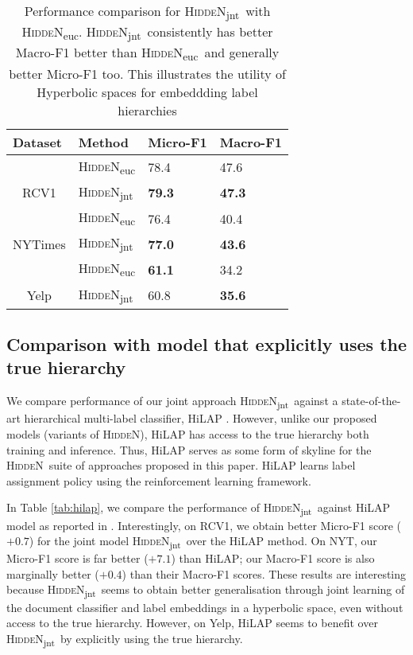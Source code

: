 \documentclass[11pt,a4paper]{article}
\newcommand{\model}{\mbox{\textsc{HiddeN}}}
\newcommand{\modeljnt}{\mbox{\textsc{HiddeN}\textsubscript{jnt}}}
\newcommand{\modeleuc}{\mbox{\textsc{HiddeN}\textsubscript{euc}}}
\begin{document}
\begin{table}[!h]
\centering
\caption{Performance comparison for \modeljnt\ with \modeleuc. \modeljnt\ consistently has better Macro-F1 better than \modeleuc\ and generally better Micro-F1 too. This illustrates the utility of Hyperbolic spaces for embeddding label hierarchies}
\label{tab:main-eucjnt}
\begin{adjustbox}{max width=0.48\textwidth}
\begin{tabular}{llll} 
\toprule
\multicolumn{1}{l}{Dataset} & Method & Micro-F1 & Macro-F1 \\ 
\toprule
& \modeleuc & 78.4 & 47.6 \\
\multicolumn{1}{c}{RCV1}
& \modeljnt & \textbf{79.3} & \textbf{47.3} \\
\hline\hline
& \modeleuc & 76.4 & 40.4 \\
\multicolumn{1}{c}{NYTimes}
 & {\modeljnt}& \textbf{77.0} & \textbf{43.6} \\
\hline\hline
& \modeleuc & \textbf{61.1}& 34.2\\
\multicolumn{1}{c}{Yelp} 
& {\modeljnt} & 60.8 & \textbf{35.6} \\
\bottomrule
\end{tabular}
\end{adjustbox}
\end{table}

\subsection{Comparison with model that explicitly uses the true hierarchy}
We compare performance of our joint approach \modeljnt\ against a state-of-the-art hierarchical multi-label classifier, HiLAP \citep{emnlp}. However, unlike our proposed models (variants of \model), HiLAP has access to the true hierarchy both training and inference. Thus, HiLAP serves as some form of skyline for the \model\ suite of approaches proposed in this paper. HiLAP learns label assignment policy using the reinforcement learning framework. 

In Table \ref{tab:hilap}, we compare the performance of \modeljnt\ against HiLAP model as reported in \citet{emnlp}. Interestingly, on RCV1, we obtain better Micro-F1 score ($+0.7$) for the joint model \modeljnt\ over the HiLAP method. On NYT, our Micro-F1 score is far better ($+7.1$) than HiLAP; our Macro-F1 score is also marginally better ($+0.4$) than their Macro-F1 scores. These results are interesting because \modeljnt\ seems to obtain better generalisation through joint learning of the document classifier and label embeddings in a hyperbolic space, even without access to the true hierarchy. However, on Yelp, HiLAP seems to benefit over \modeljnt\ by explicitly using the true hierarchy.
\end{document}
